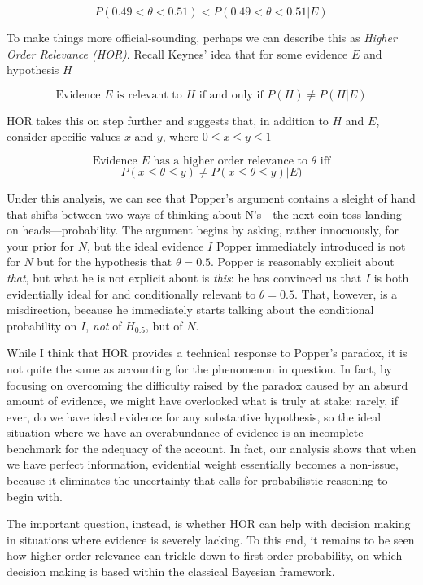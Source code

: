 \[P(0.49<\theta<0.51) <  P(0.49<\theta<0.51|E)\]

To make things more official-sounding, perhaps we can describe this as
\emph{Higher Order Relevance (HOR)}. Recall Keynes' idea  that for
some evidence \(E\) and hypothesis \(H\)

\[\text{Evidence $E$ is relevant to $H$ if and only if }P(H) \neq P(H|E)\]

HOR takes this on step further and suggests that, in addition to \(H\)
and \(E\), consider specific values \(x\) and \(y\), where
\(0 \leq x \leq y \leq 1\)

\[\text{Evidence $E$ has a higher order relevance to $\theta$ iff}\]
\[P(x\leq \theta \leq y) \neq P(x\leq \theta \leq y)|E)\]

Under this analysis, we can see that Popper's argument contains a
sleight of hand that shifts between two ways of thinking about N's---the
next coin toss landing on heads---probability. The argument begins by
asking, rather innocuously, for your prior for \(N\), but the ideal
evidence \(I\) Popper immediately introduced is not for \(N\) but for
the hypothesis that \(\theta = 0.5\). Popper is reasonably explicit
about \emph{that}, but what he is not explicit about is \emph{this}: he
has convinced us that \(I\) is both evidentially ideal for and
conditionally relevant to \(\theta = 0.5\). That, however, is a
misdirection, because he immediately starts talking about the conditional
probability on \(I\), \emph{not} of \(H_{0.5}\), but of \(N\).

While I think that HOR provides a technical response to Popper's
paradox, it is not quite the same as accounting for the phenomenon in
question. In fact, by focusing on overcoming the difficulty raised by
the paradox caused by an absurd amount of evidence, we might have
overlooked what is truly at stake: rarely, if ever, do we have ideal
evidence for any substantive hypothesis, so the ideal situation where we have an
overabundance of evidence is an incomplete benchmark for the adequacy of
the account. In fact, our analysis shows that when we have perfect
information, evidential weight essentially becomes a non-issue, because
it eliminates the uncertainty that calls for probabilistic reasoning to
begin with.

The important question, instead, is whether HOR can help with decision
making in situations where evidence is severely lacking. To this end, it
remains to be seen how higher order relevance can trickle down to first
order probability, on which decision making is based within the
classical Bayesian framework.

